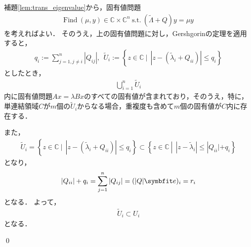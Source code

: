 \begin{Proof}
	補題\ref{lem:trans_eigenvalue}から，固有値問題
	\begin{align*}
		\mbox{Find} ~ (\mu, y) \in {\mathbb C} \times {\mathbb C}^n ~ \mbox{s.t.} ~ \left( \tilde{\Lambda} + Q  \right) y = \mu y
	\end{align*}
	を考えればよい．
	そのうえ，上の固有値問題に対し，Gershgorinの定理を適用すると，
	\begin{align*}
		q_i := \sum_{j = 1, j \neq i}^{n} | Q_{ij} |, ~~ \tilde{U}_{i} := \left\{ z \in {\mathbb C} ~ | ~~ \left| z - (\tilde{\lambda}_i + Q_{ii}) \right| \le q_i \right\}
	\end{align*}
	としたとき，
	\begin{align*}
		\bigcup_{i = 1}^{n} \tilde{U}_i
	\end{align*}
	内に固有値問題$A x = \lambda B x$のすべての固有値が含まれており，そのうえ，特に，単連結領域$C$が$m$個の$\tilde{U}_i$からなる場合，重複度も含めて$m$個の固有値が$C$内に存在する．

	また，
	\begin{align*}	
		\tilde{U}_{i} = \left\{ z \in {\mathbb C} ~ | ~~ \left| z - (\tilde{\lambda}_i + Q_{ii}) \right| \le q_i \right\} \subset \left\{ z \in {\mathbb C} ~ | ~~ \left| z - \tilde{\lambda}_i \right| \le | Q_{ii} | + q_i \right\}
	\end{align*}
	となり，
	\begin{align*}
		| Q_{ii} | + q_i = \sum_{j = 1}^{n} | Q_{ij} | = ( | Q | \vector{e} )_i = r_i
	\end{align*}
	となる．
	よって，
	\begin{align*}	
		\tilde{U}_{i} \subset U_{i}
	\end{align*}
	となる．

	\qed
\end{Proof}

